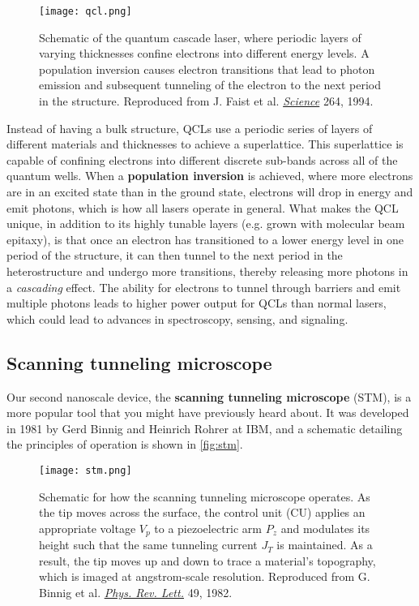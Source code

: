 \begin{figure}[!h]
	\centering
	\texttt{[image: qcl.png]}
	\caption{Schematic of the quantum cascade laser, where periodic layers of varying thicknesses confine electrons into different energy levels. 
	A population inversion causes electron transitions that lead to photon emission and subsequent tunneling of the electron to the next period in the structure. 
	Reproduced from J. Faist et al. \href{http://science.sciencemag.org/content/264/5158/553}{\emph{Science}} 264, 1994.}
	\label{fig:qcl}
\end{figure}

Instead of having a bulk structure, QCLs use a periodic series of layers of different materials and thicknesses to achieve a superlattice. 
This superlattice is capable of confining electrons into different discrete sub-bands across all of the quantum wells. 
When a \textbf{population inversion} is achieved, where more electrons are in an excited state than in the ground state, electrons will drop in energy and emit photons, which is how all lasers operate in general. 
What makes the QCL unique, in addition to its highly tunable layers (e.g. grown with molecular beam epitaxy), is that once an electron has transitioned to a lower energy level in one period of the structure, it can then tunnel to the next period in the heterostructure and undergo more transitions, thereby releasing more photons in a \emph{cascading} effect. 
The ability for electrons to tunnel through barriers and emit multiple photons leads to higher power output for QCLs than normal lasers, which could lead to advances in spectroscopy, sensing, and signaling.


\subsection{Scanning tunneling microscope}

Our second nanoscale device, the \textbf{scanning tunneling microscope} (STM), is a more popular tool that you might have previously heard about. 
It was developed in 1981 by Gerd Binnig and Heinrich Rohrer at IBM, and a schematic detailing the principles of operation is shown in \autoref{fig:stm}.

\begin{figure}[!h]
	\centering
	\texttt{[image: stm.png]}
	\caption{Schematic for how the scanning tunneling microscope operates. 
	As the tip moves across the surface, the control unit (CU) applies an appropriate voltage $V_p$ to a piezoelectric arm $P_z$ and modulates its height such that the same tunneling current $J_T$ is maintained. 
	As a result, the tip moves up and down to trace a material's topography, which is imaged at angstrom-scale resolution. 
	Reproduced from G. Binnig et al. \href{https://journals.aps.org/prl/abstract/10.1103/PhysRevLett.49.57}{\emph{Phys. Rev. Lett.}} 49, 1982.}
	\label{fig:stm}
\end{figure}

